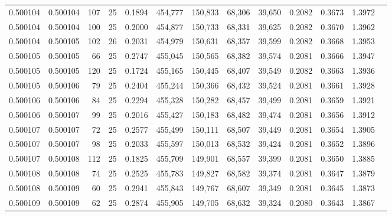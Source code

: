 \begin{tabular}{rrrrrrrrrrrrr}
0.500104 & 0.500104 & 107 &  25 &                                     0.1894 & 454,777 & 150,833 &  68,306 &  39,650 & 0.2082 & 0.3673 & 1.3972 \\
0.500104 & 0.500104 & 100 &  25 &                                     0.2000 & 454,877 & 150,733 &  68,331 &  39,625 & 0.2082 & 0.3670 & 1.3962 \\
0.500104 & 0.500105 & 102 &  26 &                                     0.2031 & 454,979 & 150,631 &  68,357 &  39,599 & 0.2082 & 0.3668 & 1.3953 \\
0.500105 & 0.500105 &  66 &  25 &                                     0.2747 & 455,045 & 150,565 &  68,382 &  39,574 & 0.2081 & 0.3666 & 1.3947 \\
0.500105 & 0.500105 & 120 &  25 &                                     0.1724 & 455,165 & 150,445 &  68,407 &  39,549 & 0.2082 & 0.3663 & 1.3936 \\
0.500105 & 0.500106 &  79 &  25 &                                     0.2404 & 455,244 & 150,366 &  68,432 &  39,524 & 0.2081 & 0.3661 & 1.3928 \\
0.500106 & 0.500106 &  84 &  25 &                                     0.2294 & 455,328 & 150,282 &  68,457 &  39,499 & 0.2081 & 0.3659 & 1.3921 \\
0.500106 & 0.500107 &  99 &  25 &                                     0.2016 & 455,427 & 150,183 &  68,482 &  39,474 & 0.2081 & 0.3656 & 1.3912 \\
0.500107 & 0.500107 &  72 &  25 &                                     0.2577 & 455,499 & 150,111 &  68,507 &  39,449 & 0.2081 & 0.3654 & 1.3905 \\
0.500107 & 0.500107 &  98 &  25 &                                     0.2033 & 455,597 & 150,013 &  68,532 &  39,424 & 0.2081 & 0.3652 & 1.3896 \\
0.500107 & 0.500108 & 112 &  25 &                                     0.1825 & 455,709 & 149,901 &  68,557 &  39,399 & 0.2081 & 0.3650 & 1.3885 \\
0.500108 & 0.500108 &  74 &  25 &                                     0.2525 & 455,783 & 149,827 &  68,582 &  39,374 & 0.2081 & 0.3647 & 1.3879 \\
0.500108 & 0.500109 &  60 &  25 &                                     0.2941 & 455,843 & 149,767 &  68,607 &  39,349 & 0.2081 & 0.3645 & 1.3873 \\
0.500109 & 0.500109 &  62 &  25 &                                     0.2874 & 455,905 & 149,705 &  68,632 &  39,324 & 0.2080 & 0.3643 & 1.3867 \\

\end{tabular}
